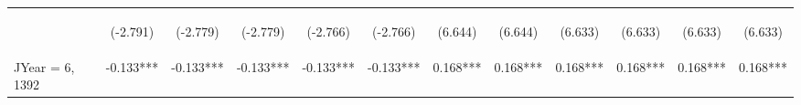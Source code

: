 \documentclass[]{article}
\begin{document}
\begin{center}
\begin{tabular}{lccccccccccc}
        \vspace{4pt}     & \begin{footnotesize}(-2.791)\end{footnotesize} & \begin{footnotesize}(-2.779)\end{footnotesize} & \begin{footnotesize}(-2.779)\end{footnotesize} & \begin{footnotesize}(-2.766)\end{footnotesize} & \begin{footnotesize}(-2.766)\end{footnotesize} & \begin{footnotesize}(6.644)\end{footnotesize}   & \begin{footnotesize}(6.644)\end{footnotesize}   & \begin{footnotesize}(6.633)\end{footnotesize}  & \begin{footnotesize}(6.633)\end{footnotesize}  & \begin{footnotesize}(6.633)\end{footnotesize}  & \begin{footnotesize}(6.633)\end{footnotesize}  \\
        JYear = 6, 1392  & -0.133***                                      & -0.133***                                      & -0.133***                                      & -0.133***                                      & -0.133***                                      & 0.168***                                        & 0.168***                                        & 0.168***                                       & 0.168***                                       & 0.168***                                       & 0.168***                                       \\

\end{tabular}
\end{center}
\end{document}
